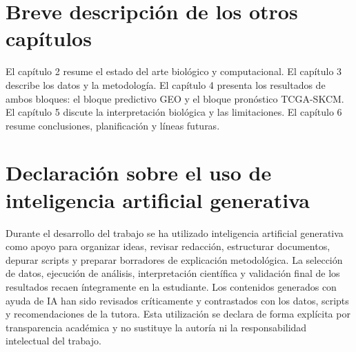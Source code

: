 \section{Breve descripción de los otros capítulos}

El capítulo 2 resume el estado del arte biológico y computacional. El capítulo 3 describe los datos y la metodología. El capítulo 4 presenta los resultados de ambos bloques: el bloque predictivo GEO y el bloque pronóstico TCGA-SKCM. El capítulo 5 discute la interpretación biológica y las limitaciones. El capítulo 6 resume conclusiones, planificación y líneas futuras.

\section{Declaración sobre el uso de inteligencia artificial generativa}

Durante el desarrollo del trabajo se ha utilizado inteligencia artificial generativa como apoyo para organizar ideas, revisar redacción, estructurar documentos, depurar scripts y preparar borradores de explicación metodológica. La selección de datos, ejecución de análisis, interpretación científica y validación final de los resultados recaen íntegramente en la estudiante. Los contenidos generados con ayuda de IA han sido revisados críticamente y contrastados con los datos, scripts y recomendaciones de la tutora. Esta utilización se declara de forma explícita por transparencia académica y no sustituye la autoría ni la responsabilidad intelectual del trabajo.
